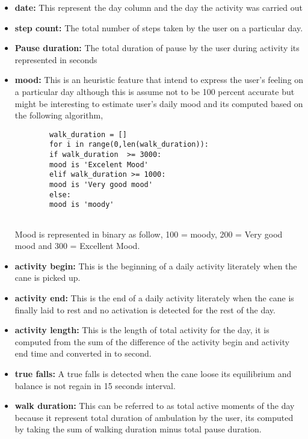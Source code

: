 \documentclass[a4paper, parskip=full]{scrartcl}
\begin{document}
\begin{itemize}
	\item  \textbf{ date:} This represent the day column and the day the activity was carried out
	
	
	\item   \textbf{step count:} The total number of steps taken by the user on a particular day.
	
	\item \textbf{Pause duration:} The total duration of pause by the user during activity its represented in seconds
	
	\item \textbf{mood:} This is an heuristic feature that intend to express the user's feeling on a particular day although this is assume not to be 100 percent accurate but might be interesting to estimate user's daily mood and its computed based on the following algorithm,
	
	\begin{lstlisting}
		walk_duration = []
		for i in range(0,len(walk_duration)):
		if walk_duration  >= 3000:
		mood is 'Excelent Mood'
		elif walk_duration >= 1000:
		mood is 'Very good mood'
		else:
		mood is 'moody'
		
	\end{lstlisting}
	
Mood is represented in binary as follow, 100 = moody, 200 = Very good mood	and 300 = Excellent Mood.

\item \textbf{activity begin:} This is the beginning of a daily activity literately when the cane is picked up.

\item \textbf{activity end:} This is the end of a daily activity literately when the cane is finally laid to rest and no activation is detected for the rest of the day.
	
\item \textbf{activity length:} This is the length of total activity for the day, it is computed from the sum of the difference of the activity begin and activity end time and converted in to second.

\item \textbf{true falls:} A true falls is detected when the cane loose its equilibrium and balance is not regain in 15 seconds interval.

\item \textbf{walk duration:} This can be referred to as total active moments of the day because it represent total duration of ambulation by the user, its computed by taking the sum of walking duration minus total pause duration.


\end{itemize}
\end{document}
